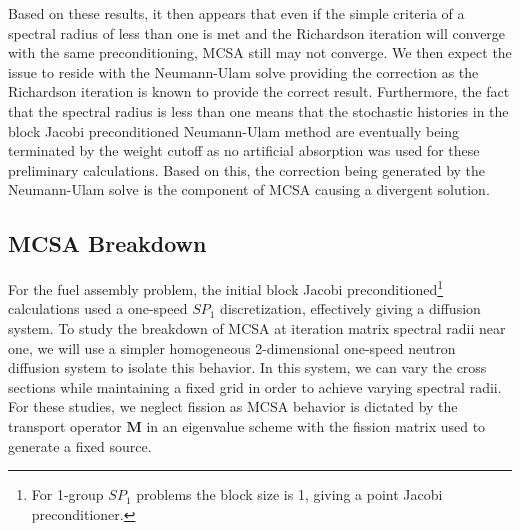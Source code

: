 Based on these results, it then appears that even if the simple
criteria of a spectral radius of less than one is met and the
Richardson iteration will converge with the same preconditioning, MCSA
still may not converge. We then expect the issue to reside with the
Neumann-Ulam solve providing the correction as the Richardson
iteration is known to provide the correct result. Furthermore, the
fact that the spectral radius is less than one means that the
stochastic histories in the block Jacobi preconditioned Neumann-Ulam
method are eventually being terminated by the weight cutoff as no
artificial absorption was used for these preliminary
calculations. Based on this, the correction being generated by the
Neumann-Ulam solve is the component of MCSA causing a divergent
solution.

\subsection{MCSA Breakdown}
\label{subsec:mcsa_break_down}
For the fuel assembly problem, the initial block Jacobi
preconditioned\footnote{For 1-group $SP_1$ problems the block size is
  1, giving a point Jacobi preconditioner.}  calculations used a
one-speed $SP_1$ discretization, effectively giving a diffusion
system. To study the breakdown of MCSA at iteration matrix spectral
radii near one, we will use a simpler homogeneous 2-dimensional
one-speed neutron diffusion system to isolate this behavior. In this
system, we can vary the cross sections while maintaining a fixed grid
in order to achieve varying spectral radii. For these studies, we
neglect fission as MCSA behavior is dictated by the transport operator
$\mathbf{M}$ in an eigenvalue scheme with the fission matrix used to
generate a fixed source.

